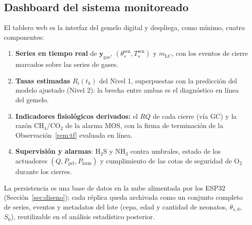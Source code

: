\subsection{Dashboard del sistema monitoreado}\label{sec:dashboard}

El tablero web es la interfaz del gemelo digital y despliega, como
mínimo, cuatro componentes:

\begin{enumerate}
  \item \textbf{Series en tiempo real} de $\mathbf{y}_{\mathrm{gas}}$,
  $(\theta_s^{\mathrm{sen}}, T_s^{\mathrm{sen}})$ y $m_{\mathrm{LC}}$,
  con los eventos de cierre marcados sobre las series de gases.
  \item \textbf{Tasas estimadas} $R_i(t_k)$ del Nivel 1, superpuestas
  con la predicción del modelo ajustado (Nivel 2): la brecha entre
  ambas es el diagnóstico en línea del gemelo.
  \item \textbf{Indicadores fisiológicos derivados:}
  el $RQ$ de cada cierre (vía GC) y la razón CH$_4$/CO$_2$ de la alarma
  MOS, con la firma de terminación de la Observación~\ref{rem:tf} evaluada
  en línea.
  \item \textbf{Supervisión y alarmas}: H$_2$S y NH$_3$ contra umbrales,
  estado de los actuadores $(Q, P_{\mathrm{pel}}, P_{\mathrm{hum}})$ y
  cumplimiento de las cotas de seguridad de O$_2$ durante los cierres.
\end{enumerate}

La persistencia es una base de datos en la nube alimentada por los
ESP32 (Sección~\ref{sec:diseno}); cada réplica queda archivada como un
conjunto completo de series, eventos y metadatos del lote (cepa, edad y
cantidad de neonatos, $\theta_{s,0}$, $S_0$), reutilizable en el
análisis estadístico posterior.
